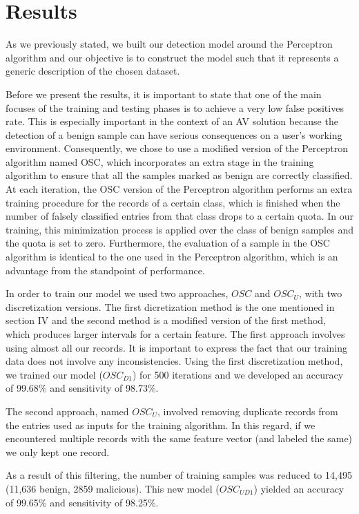 \section{Results}
\par
As we previously stated, we built our detection model around the Perceptron algorithm and our objective is to construct the model such that it represents a generic description of the chosen dataset.
\par
Before we present the results, it is important to state that one of the main focuses of the training and testing phases is to achieve a very low false positives rate. This is especially important in the context of an AV solution because the detection of a benign sample can have serious consequences on a user's working environment. Consequently, we chose to use a modified version of the Perceptron algorithm named OSC, which incorporates an extra stage in the training algorithm to ensure that all the samples marked as benign are correctly classified. At each iteration, the OSC version of the Perceptron algorithm performs an extra training procedure for the records of a certain class, which is finished when the number of falsely classified entries from that class drops to a certain quota. In our training, this minimization process is applied over the class of benign samples and the quota is set to zero. Furthermore, the evaluation of a sample in the OSC algorithm is identical to the one used in the Perceptron algorithm, which is an advantage from the standpoint of performance.
\par
In order to train our model we used two approaches, $OSC$ and $OSC_{U}$, with two discretization versions. The first dicretization method is the one mentioned in section IV and the second method is a modified version of the first method, which produces larger intervals for a certain feature. The first approach involves using almost all our records. It is important to express the fact that our training data does not involve any inconsistencies. Using the first discretization method, we trained our model ({$OSC_{D1}$}) for 500 iterations and we developed an accuracy of 99.68\% and sensitivity of 98.73\%. 
\par
The second approach, named $OSC_{U}$,  involved removing duplicate records from the entries used as inputs for the training algorithm. In this regard, if we encountered multiple records with the same feature vector (and labeled the same) we only kept one record.
\par
As a result of this filtering, the number of training samples was reduced to 14,495 (11,636 benign, 2859 malicious). This new model ({$OSC_{UD1}$}) yielded an accuracy of 99.65\% and sensitivity of 98.25\%.
